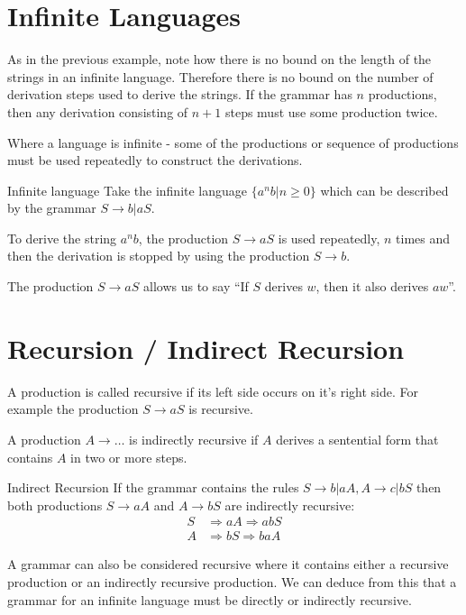 \section{Infinite Languages}
As in the previous example, note how there is no bound on the length of the strings in an infinite language. Therefore there is no bound on the number of derivation steps used to derive the strings. If the grammar has $n$ productions, then any derivation consisting of $n+1$ steps must use some production twice.

Where a language is infinite - some of the productions or sequence of productions must be used repeatedly to construct the derivations. 

\begin{example}{Infinite language}
Take the infinite language $\{a^nb | n \geq 0\}$ which can be described by the grammar $S \rightarrow b | aS$. 

To derive the string $a^nb$, the production $S \rightarrow aS$ is used repeatedly, $n$ times and then the derivation is stopped by using the production $S \rightarrow b$. 
\end{example}

The production $S \rightarrow aS$ allows us to say ``If $S$ derives $w$, then it also derives $aw$''. 


\section{Recursion / Indirect Recursion}
A production is called recursive if its left side occurs on it's right side. For example the production $S \rightarrow aS$ is recursive. 

A production $A \rightarrow \ldots$ is indirectly recursive if $A$ derives a sentential form that contains $A$ in two or more steps.
\begin{example} {Indirect Recursion}
If the grammar contains the rules $S \rightarrow b|aA, A \rightarrow c|bS$ then both productions $S \rightarrow aA$ and $A \rightarrow bS$ are indirectly recursive:
\begin{align*}
    S &\Rightarrow aA \Rightarrow abS\\
    A &\Rightarrow bS \Rightarrow baA
\end{align*}
\end{example}

A grammar can also be considered recursive where it contains either a recursive production or an indirectly recursive production. We can deduce from this that a grammar for an infinite language must be directly or indirectly recursive. 

